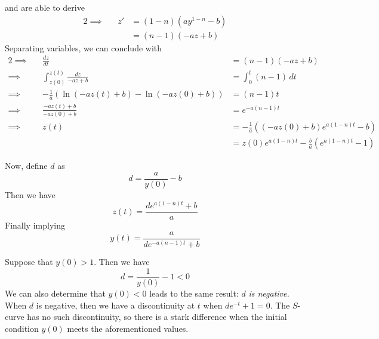 \documentclass[a4paper]{article}
\begin{document}
and are able to derive
\begin{alignat*}{2}
	\implies && z' & = \!\left( 1 - n \right) \!\left(ay^{1-n} - b\right) \\
	&& & = \!\left( n - 1 \right) \!\left( -az + b \right)
\end{alignat*}
Separating variables, we can conclude with
\begin{alignat*}{2}
	\implies && \frac{d z}{d t}  & = \!\left( n - 1 \right) \!\left( -az + b \right)  \\
	\implies && \int^{z \!\left( t \right) }_{z \!\left( 0 \right) } \frac{dz}{-az + b}  & = \int^{t}_{0} \!\left( n - 1 \right)  \, dt  \\ 
	\implies && -\frac{1}{a} \!\left( \ln\left( -az \!\left( t \right) + b \right) - \ln\left( -a z \!\left( 0 \right) + b \right) \right) & = \!\left( n - 1 \right) t \\
	\implies && \frac{-a z \!\left( t \right) + b}{-a z \!\left( 0 \right) + b} & = e^{-a \!\left( n - 1 \right) t} \\
	\implies && z \!\left( t \right) & = -\frac{1}{a} \!\left( \!\left( -a z \!\left( 0 \right) + b \right) e^{a \!\left( 1 - n \right) t} - b \right) \\ 
		 && & = z \!\left( 0 \right) e^{a \!\left( 1 - n \right) t} - \frac{b}{a} \!\left( e^{a \!\left( 1 - n \right) t} - 1 \right) 
\end{alignat*}

Now, define \(d\) as
\[
	d = \frac{a}{y \!\left( 0 \right) } - b
\]
Then we have
\[
	z \!\left( t \right) = \frac{de^{a \!\left( 1 - n \right) t} + b}{a}
\]
Finally implying
\[
	y \!\left( t \right) = \frac{a}{de^{-a \!\left( n - 1 \right) t} + b}
\]


Suppose that \(y \!\left( 0 \right) > 1\). Then we have
\[
	d = \frac{1}{y \!\left( 0 \right) } - 1 < 0
\]
We can also determine that \(y \!\left( 0 \right) < 0\) leads to the same result: \(d\) \textit{is negative.} When \(d\) is negative, then we have a discontinuity at \(t\) when \(de^{-t} + 1 = 0\). The \(S\)-curve has no such discontinuity, so there is a stark difference when the initial condition \(y \!\left( 0 \right) \) meets the aforementioned values.
\end{document}
